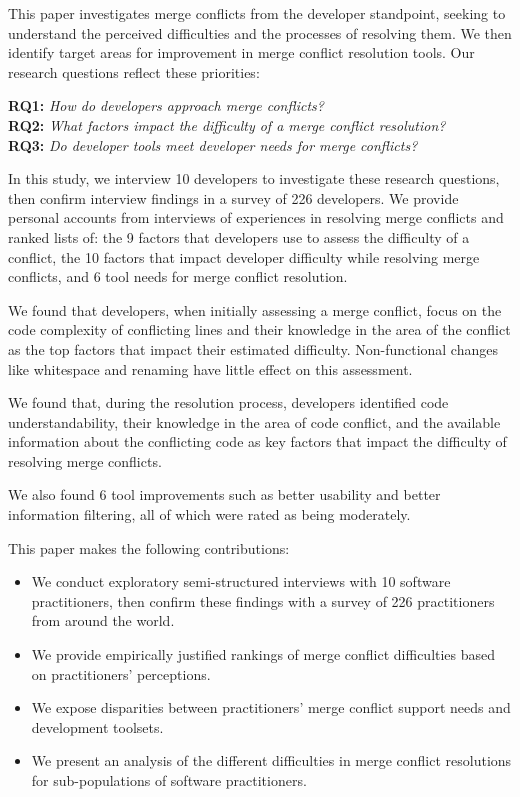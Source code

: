 This paper investigates merge conflicts from the developer standpoint, seeking to understand the perceived difficulties and the processes of resolving them.
We then identify target areas for improvement in merge conflict resolution tools.
Our research questions reflect these priorities:

\vspace{3px}
\noindent\textbf{RQ1:} \textit{How do developers approach merge conflicts?}\\
\noindent\textbf{RQ2:} \textit{What factors impact the difficulty of a merge conflict resolution?}\\
\noindent\textbf{RQ3:} \textit{Do developer tools meet developer needs for merge conflicts?}
\vspace{3px}

In this study, we interview 10 developers to investigate these research questions, then confirm interview findings in a survey of 226 developers. We provide personal accounts from interviews of experiences in resolving merge conflicts and ranked lists of: the 9 factors that developers use to assess the difficulty of a conflict, the 10 factors that impact developer difficulty while resolving merge conflicts, and 6 tool needs for merge conflict resolution.

We found that developers, when initially assessing a merge conflict, focus on the code complexity of conflicting lines and their knowledge in the area of the conflict as the top factors that impact their estimated difficulty.
Non-functional changes like whitespace and renaming have little effect on this assessment. 

We found that, during the resolution process, developers identified code understandability, their knowledge in the area of code conflict, and the available information about the conflicting code as key factors that impact the difficulty of resolving merge conflicts.

We also found 6 tool improvements such as better usability and better information filtering, all of which were rated as being moderately.

This paper makes the following contributions:
\begin{itemize}
\item We conduct exploratory semi-structured interviews with 10 software practitioners, then confirm these findings with a survey of 226 practitioners from around the world.
\item We provide empirically justified rankings of merge conflict difficulties based on practitioners' perceptions.
\item We expose disparities between practitioners' merge conflict support needs and development toolsets.
\item We present an analysis of the different difficulties in merge conflict resolutions for sub-populations of software practitioners.
\end{itemize}